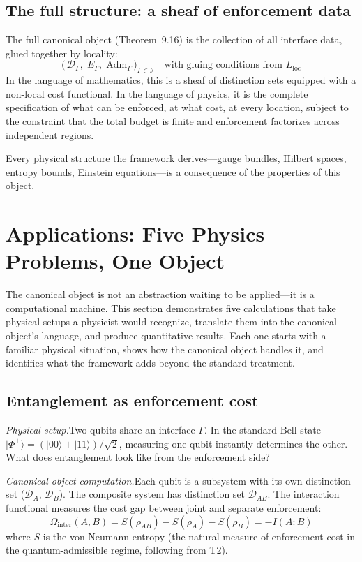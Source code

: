 \documentclass[11pt]{article}
\newcommand{\Adm}{\mathrm{Adm}}
\begin{document}
\subsection{The full structure: a sheaf of enforcement data}

The full canonical object (Theorem~9.16) is the collection of all interface data, glued together by locality:
\begin{equation}
\bigl(\, \mathcal{D}_\Gamma,\; E_\Gamma,\; \Adm_\Gamma \,\bigr)_{\Gamma \in \mathcal{I}} \quad\text{with gluing conditions from } L_{\mathrm{loc}}
\end{equation}
In the language of mathematics, this is a sheaf of distinction sets equipped with a non-local cost functional.  In the language of physics, it is the complete specification of what can be enforced, at what cost, at every location, subject to the constraint that the total budget is finite and enforcement factorizes across independent regions.

Every physical structure the framework derives---gauge bundles, Hilbert spaces, entropy bounds, Einstein equations---is a consequence of the properties of this object.


\section{Applications: Five Physics Problems, One Object}

The canonical object is not an abstraction waiting to be applied---it is a computational machine.  This section demonstrates five calculations that take physical setups a physicist would recognize, translate them into the canonical object's language, and produce quantitative results.  Each one starts with a familiar physical situation, shows how the canonical object handles it, and identifies what the framework adds beyond the standard treatment.

\subsection{Entanglement as enforcement cost}

\textit{Physical setup.}\quad Two qubits share an interface $\Gamma$.  In the standard Bell state $|\Phi^+\rangle = (|00\rangle + |11\rangle)/\sqrt{2}$, measuring one qubit instantly determines the other.  What does entanglement look like from the enforcement side?

\textit{Canonical object computation.}\quad Each qubit is a subsystem with its own distinction set ($\mathcal{D}_A$, $\mathcal{D}_B$).  The composite system has distinction set $\mathcal{D}_{AB}$.  The interaction functional measures the cost gap between joint and separate enforcement:
\begin{equation}
\Omega_{\mathrm{inter}}(A,B) = S(\rho_{AB}) - S(\rho_A) - S(\rho_B) = -I(A{:}B)
\end{equation}
where $S$ is the von Neumann entropy (the natural measure of enforcement cost in the quantum-admissible regime, following from T2).
\end{document}
